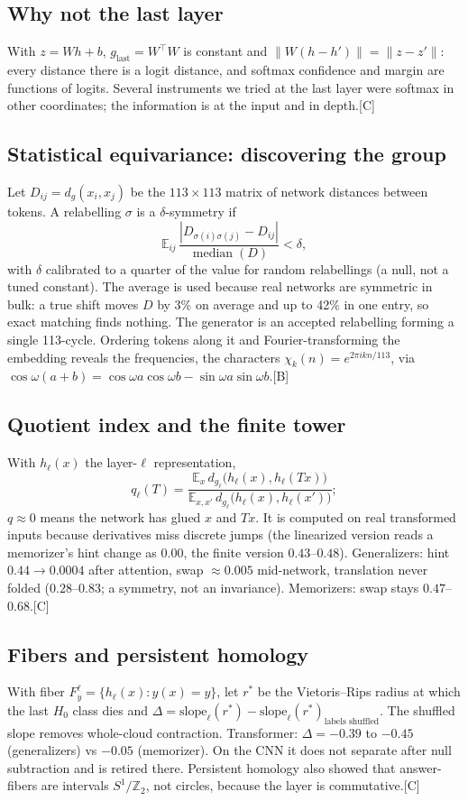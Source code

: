 \documentclass[11pt]{article}
\newcommand{\E}{\mathbb{E}}
\newcommand{\Z}{\mathbb{Z}}
\newcommand{\lev}[1]{\textsc{[#1]}}%
\begin{document}
\subsection{Why not the last layer}
With $z=Wh+b$, $g_{\text{last}}=W^\top W$ is constant and $\|W(h-h')\|=\|z-z'\|$: every distance there is a logit distance, and softmax confidence and margin are functions of logits. Several instruments we tried at the last layer were softmax in other coordinates; the information is at the input and in depth.\hfill\lev{C}

\subsection{Statistical equivariance: discovering the group}
Let $D_{ij}=d_g(x_i,x_j)$ be the $113\times113$ matrix of network distances between tokens. A relabelling $\sigma$ is a $\delta$-symmetry if
\[
\E_{ij}\,\frac{|D_{\sigma(i)\sigma(j)}-D_{ij}|}{\operatorname{median}(D)}<\delta,
\]
with $\delta$ calibrated to a quarter of the value for random relabellings (a null, not a tuned constant). The average is used because real networks are symmetric in bulk: a true shift moves $D$ by 3\% on average and up to 42\% in one entry, so exact matching finds nothing. The generator is an accepted relabelling forming a single 113-cycle. Ordering tokens along it and Fourier-transforming the embedding reveals the frequencies, the characters $\chi_k(n)=e^{2\pi i kn/113}$, via $\cos\omega(a+b)=\cos\omega a\cos\omega b-\sin\omega a\sin\omega b$.\hfill\lev{B}

\subsection{Quotient index and the finite tower}
With $h_\ell(x)$ the layer-$\ell$ representation,
\[
q_\ell(T)=\frac{\E_x\, d_{g_\ell}\!\big(h_\ell(x),h_\ell(Tx)\big)}{\E_{x,x'}\, d_{g_\ell}\!\big(h_\ell(x),h_\ell(x')\big)} ;
\]
$q\approx0$ means the network has glued $x$ and $Tx$. It is computed on real transformed inputs because derivatives miss discrete jumps (the linearized version reads a memorizer's hint change as $0.00$, the finite version $0.43$--$0.48$). Generalizers: hint $0.44\to0.0004$ after attention, swap $\approx0.005$ mid-network, translation never folded ($0.28$--$0.83$; a symmetry, not an invariance). Memorizers: swap stays $0.47$--$0.68$.\hfill\lev{C}

\subsection{Fibers and persistent homology}
With fiber $F^\ell_y=\{h_\ell(x):y(x)=y\}$, let $r^*$ be the Vietoris--Rips radius at which the last $H_0$ class dies and $\Delta=\text{slope}_\ell(r^*)-\text{slope}_\ell(r^*)_{\text{labels shuffled}}$. The shuffled slope removes whole-cloud contraction. Transformer: $\Delta=-0.39$ to $-0.45$ (generalizers) vs $-0.05$ (memorizer). On the CNN it does not separate after null subtraction and is retired there. Persistent homology also showed that answer-fibers are intervals $S^1/\Z_2$, not circles, because the layer is commutative.\hfill\lev{C}
\end{document}
